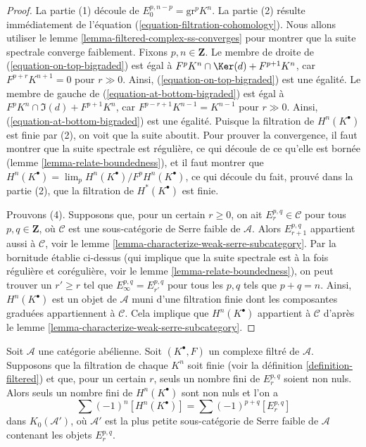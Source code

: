 \begin{proof}
La partie (1) découle de $E_0^{p, n - p} = \text{gr}^p K^n$.
La partie (2) résulte immédiatement de l'équation (\ref{equation-filtration-cohomology}).
Nous allons utiliser le lemme \ref{lemma-filtered-complex-ss-converges} pour montrer
que la suite spectrale converge faiblement. Fixons $p, n \in \mathbf{Z}$.
Le membre de droite de (\ref{equation-on-top-bigraded})
est égal à $F^pK^n \cap \Ker(d) + F^{p + 1}K^n$, car
$F^{p + r}K^{n + 1} = 0$ pour $r \gg 0$. Ainsi, (\ref{equation-on-top-bigraded})
est une égalité. Le membre de gauche de (\ref{equation-at-bottom-bigraded})
est égal à $F^pK^n \cap \Im(d) + F^{p + 1}K^n$, car
$F^{p - r + 1}K^{n - 1} = K^{n - 1}$ pour $r \gg 0$.
Ainsi, (\ref{equation-at-bottom-bigraded}) est une égalité. Puisque la filtration
de $H^n(K^\bullet)$ est finie par (2), on voit que la suite aboutit.
Pour prouver la convergence, il faut montrer que la suite spectrale est
régulière, ce qui découle de ce qu'elle est bornée
(lemme \ref{lemma-relate-boundedness}), et il faut
montrer que $H^n(K^\bullet) = \lim_p H^n(K^\bullet)/F^pH^n(K^\bullet)$,
ce qui découle du fait, prouvé dans la partie (2), que la filtration de $H^*(K^\bullet)$
est finie.

\medskip\noindent
Prouvons (4). Supposons que, pour un certain $r \geq 0$, on ait
$E_r^{p, q} \in \mathcal{C}$ pour tous $p, q \in \mathbf{Z}$, où
$\mathcal{C}$ est une sous-catégorie de Serre faible de $\mathcal{A}$.
Alors $E_{r + 1}^{p, q}$
appartient aussi à $\mathcal{C}$, voir le
lemme \ref{lemma-characterize-weak-serre-subcategory}.
Par la bornitude établie ci-dessus (qui implique que la suite spectrale
est à la fois régulière et corégulière, voir le lemme \ref{lemma-relate-boundedness}),
on peut trouver un $r' \geq r$ tel que $E_\infty^{p, q} = E_{r'}^{p, q}$
pour tous les $p, q$ tels que $p + q = n$. Ainsi, $H^n(K^\bullet)$ est un objet
de $\mathcal{A}$ muni d'une filtration finie dont les composantes graduées
appartiennent à $\mathcal{C}$. Cela implique que $H^n(K^\bullet)$ appartient à $\mathcal{C}$
d'après le lemme \ref{lemma-characterize-weak-serre-subcategory}.
\end{proof}

\begin{lemma}
\label{lemma-biregular-ss-relation-in-K0}
Soit $\mathcal{A}$ une catégorie abélienne. Soit $(K^\bullet, F)$ un
complexe filtré de $\mathcal{A}$. Supposons que la filtration de chaque $K^n$
soit finie (voir la définition \ref{definition-filtered}) et que, pour un certain
$r$, seuls un nombre fini de $E_r^{p, q}$ soient non nuls. Alors
seuls un nombre fini de $H^n(K^\bullet)$ sont non nuls et l'on a
$$
\sum (-1)^n[H^n(K^\bullet)] = \sum (-1)^{p + q} [E_r^{p, q}]
$$
dans $K_0(\mathcal{A}')$, où $\mathcal{A}'$ est la plus petite sous-catégorie de
Serre faible de $\mathcal{A}$ contenant les objets
$E_r^{p, q}$.
\end{lemma}

